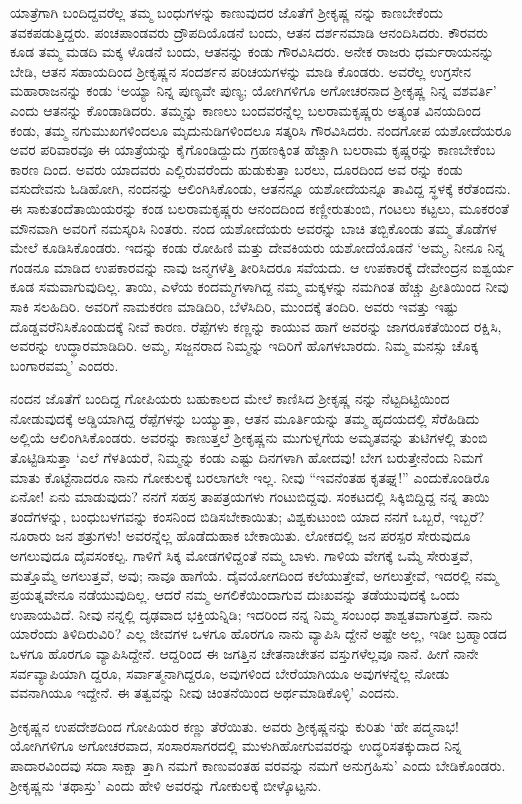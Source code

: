 ಯಾತ್ರೆಗಾಗಿ ಬಂದಿದ್ದವರೆಲ್ಲ ತಮ್ಮ ಬಂಧುಗಳನ್ನು ಕಾಣುವುದರ ಜೊತೆಗೆ ಶ್ರೀಕೃಷ್ಣ ನನ್ನು ಕಾಣಬೇಕೆಂದು ತವಕಪಡುತ್ತಿದ್ದರು. ಪಂಚಪಾಂಡವರು ದ್ರೌಪದಿಯೊಡನೆ ಬಂದು, ಆತನ ದರ್ಶನಮಾಡಿ ಆನಂದಿಸಿದರು. ಕೌರವರು ಕೂಡ ತಮ್ಮ ಮಡದಿ ಮಕ್ಕ ಳೊಡನೆ ಬಂದು, ಆತನನ್ನು ಕಂಡು ಗೌರವಿಸಿದರು. ಅನೇಕ ರಾಜರು ಧರ್ಮರಾಯನನ್ನು ಬೇಡಿ, ಆತನ ಸಹಾಯದಿಂದ ಶ್ರೀಕೃಷ್ಣನ ಸಂದರ್ಶನ ಪರಿಚಯಗಳನ್ನು ಮಾಡಿ ಕೊಂಡರು. ಅವರೆಲ್ಲ ಉಗ್ರಸೇನ ಮಹಾರಾಜನನ್ನು ಕಂಡು ‘ಅಯ್ಯಾ ನಿನ್ನ ಪುಣ್ಯವೇ ಪುಣ್ಯ; ಯೋಗಿಗಳಿಗೂ ಅಗೋಚರನಾದ ಶ್ರೀಕೃಷ್ಣ ನಿನ್ನ ವಶವರ್ತಿ’ ಎಂದು ಆತನನ್ನು ಕೊಂಡಾಡಿದರು. ತಮ್ಮನ್ನು ಕಾಣಲು ಬಂದವರನ್ನೆಲ್ಲ ಬಲರಾಮಕೃಷ್ಣರು ಅತ್ಯಂತ ವಿನಯದಿಂದ ಕಂಡು, ತಮ್ಮ ನಗುಮುಖಗಳಿಂದಲೂ ಮೃದುನುಡಿಗಳಿಂದಲೂ ಸತ್ಕರಿಸಿ ಗೌರವಿಸಿದರು. ನಂದಗೋಪ ಯಶೋದೆಯರೂ ಅವರ ಪರಿವಾರವೂ ಈ ಯಾತ್ರೆಯನ್ನು ಕೈಗೊಂಡಿದ್ದುದು ಗ್ರಹಣಕ್ಕಿಂತ ಹೆಚ್ಚಾಗಿ ಬಲರಾಮ ಕೃಷ್ಣರನ್ನು ಕಾಣಬೇಕೆಂಬ ಕಾರಣ ದಿಂದ. ಅವರು ಯಾದವರು ಎಲ್ಲಿರುವರೆಂದು ಹುಡುಕುತ್ತಾ ಬರಲು, ದೂರದಿಂದ ಅವ ರನ್ನು ಕಂಡು ವಸುದೇವನು ಓಡಿಹೋಗಿ, ನಂದನನ್ನು ಆಲಿಂಗಿಸಿಕೊಂಡು, ಆತನನ್ನೂ ಯಶೋದೆಯನ್ನೂ ತಾವಿದ್ದ ಸ್ಥಳಕ್ಕೆ ಕರೆತಂದನು. ಈ ಸಾಕುತಂದೆತಾಯಿಯರನ್ನು ಕಂಡ ಬಲರಾಮಕೃಷ್ಣರು ಆನಂದದಿಂದ ಕಣ್ಣೀರುತುಂಬಿ, ಗಂಟಲು ಕಟ್ಟಲು, ಮೂಕರಂತೆ ಮೌನವಾಗಿ ಅವರಿಗೆ ನಮಸ್ಕರಿಸಿ ನಿಂತರು. ನಂದ ಯಶೋದೆಯರು ಅವರನ್ನು ಬಾಚಿ ತಬ್ಬಿಕೊಂಡು ತಮ್ಮ ತೊಡೆಗಳ ಮೇಲೆ ಕೂಡಿಸಿಕೊಂಡರು. ಇದನ್ನು ಕಂಡು ರೋಹಿಣಿ ಮತ್ತು ದೇವಕಿಯರು ಯಶೋದೆಯೊಡನೆ ‘ಅಮ್ಮ, ನೀನೂ ನಿನ್ನ ಗಂಡನೂ ಮಾಡಿದ ಉಪಕಾರವನ್ನು ನಾವು ಜನ್ಮಗಳೆತ್ತಿ ತೀರಿಸಿದರೂ ಸವೆಯದು. ಆ ಉಪಕಾರಕ್ಕೆ ದೇವೇಂದ್ರನ ಐಶ್ವರ್ಯ ಕೂಡ ಸಮವಾಗುವುದಿಲ್ಲ. ತಾಯಿ, ಎಳೆಯ ಕಂದಮ್ಮಗಳಾಗಿದ್ದ ನಮ್ಮ ಮಕ್ಕಳನ್ನು ನಮಗಿಂತ ಹೆಚ್ಚು ಪ್ರೀತಿಯಿಂದ ನೀವು ಸಾಕಿ ಸಲಹಿದಿರಿ. ಅವರಿಗೆ ನಾಮಕರಣ ಮಾಡಿದಿರಿ, ಬೆಳೆಸಿದಿರಿ, ಮುಂದಕ್ಕೆ ತಂದಿರಿ. ಅವರು ಇವತ್ತು ಇಷ್ಟು ದೊಡ್ಡವರೆನಿಸಿಕೊಂಡುದಕ್ಕೆ ನೀವೆ ಕಾರಣ. ರೆಪ್ಪೆಗಳು ಕಣ್ಣನ್ನು ಕಾಯುವ ಹಾಗೆ ಅವರನ್ನು ಜಾಗರೂಕತೆಯಿಂದ ರಕ್ಷಿಸಿ, ಅವರನ್ನು ಉದ್ಧಾರಮಾಡಿದಿರಿ. ಅಮ್ಮ, ಸಜ್ಜನರಾದ ನಿಮ್ಮನ್ನು ಇದಿರಿಗೆ ಹೊಗಳಬಾರದು. ನಿಮ್ಮ ಮನಸ್ಸು ಚೊಕ್ಕ ಬಂಗಾರವಮ್ಮ’ ಎಂದರು.

ನಂದನ ಜೊತೆಗೆ ಬಂದಿದ್ದ ಗೋಪಿಯರು ಬಹುಕಾಲದ ಮೇಲೆ ಕಾಣಿಸಿದ ಶ್ರೀಕೃಷ್ಣ ನನ್ನು ನೆಟ್ಟದಿಟ್ಟಿಯಿಂದ ನೋಡುವುದಕ್ಕೆ ಅಡ್ಡಿಯಾಗಿದ್ದ ರೆಪ್ಪೆಗಳನ್ನು ಬಯ್ಯುತ್ತಾ, ಆತನ ಮೂರ್ತಿಯನ್ನು ತಮ್ಮ ಹೃದಯದಲ್ಲಿ ಸೆರೆಹಿಡಿದು ಅಲ್ಲಿಯೆ ಆಲಿಂಗಿಸಿಕೊಂಡರು. ಅವರನ್ನು ಕಾಣುತ್ತಲೆ ಶ್ರೀಕೃಷ್ಣನು ಮುಗುಳ್ನಗೆಯ ಅಮೃತವನ್ನು ತುಟಿಗಳಲ್ಲಿ ತುಂಬಿ ತೊಟ್ಟಿಡಿಸುತ್ತಾ ‘ಎಲೆ ಗೆಳತಿಯರೆ, ನಿಮ್ಮನ್ನು ಕಂಡು ಎಷ್ಟು ದಿನಗಳಾಗಿ ಹೋದವು! ಬೇಗ ಬರುತ್ತೇನೆಂದು ನಿಮಗೆ ಮಾತು ಕೊಟ್ಟೆನಾದರೂ ನಾನು ಗೋಕುಲಕ್ಕೆ ಬರಲಾಗಲೇ ಇಲ್ಲ. ನೀವು “ಇವನೆಂತಹ ಕೃತಘ್ನ!” ಎಂದುಕೊಂಡಿರೊ ಏನೋ! ಏನು ಮಾಡುವುದು? ನನಗೆ ಸಹಸ್ರ ತಾಪತ್ರಯಗಳು ಗಂಟುಬಿದ್ದವು. ಸಂಕಟದಲ್ಲಿ ಸಿಕ್ಕಿಬಿದ್ದಿದ್ದ ನನ್ನ ತಾಯಿ ತಂದೆಗಳನ್ನು, ಬಂಧುಬಳಗವನ್ನು ಕಂಸನಿಂದ ಬಿಡಿಸಬೇಕಾಯಿತು; ವಿಶ್ವಕುಟುಂಬಿ ಯಾದ ನನಗೆ ಒಬ್ಬರೆ, ಇಬ್ಬರೆ? ನೂರಾರು ಜನ ಶತ್ರುಗಳು! ಅವರನ್ನೆಲ್ಲ ಹೊಡೆದುಹಾಕ ಬೇಕಾಯಿತು. ಲೋಕದಲ್ಲಿ ಜನ ಪರಸ್ಪರ ಸೇರುವುದೂ ಅಗಲುವುದೂ ದೈವಸಂಕಲ್ಪ. ಗಾಳಿಗೆ ಸಿಕ್ಕ ಮೋಡಗಳಿದ್ದಂತೆ ನಮ್ಮ ಬಾಳು. ಗಾಳಿಯ ವೇಗಕ್ಕೆ ಒಮ್ಮೆ ಸೇರುತ್ತವೆ, ಮತ್ತೊಮ್ಮೆ ಅಗಲುತ್ತವೆ, ಅವು; ನಾವೂ ಹಾಗೆಯೆ. ದೈವಯೋಗದಿಂದ ಕಲೆಯುತ್ತೇವೆ, ಅಗಲುತ್ತೇವೆ, ಇದರಲ್ಲಿ ನಮ್ಮ ಪ್ರಯತ್ನವೇನೂ ನಡೆಯುವುದಿಲ್ಲ. ಆದರೆ ನಮ್ಮ ಅಗಲಿಕೆಯಿಂದಾಗುವ ದುಃಖವನ್ನು ತಡೆಯುವುದಕ್ಕೆ ಒಂದು ಉಪಾಯವಿದೆ. ನೀವು ನನ್ನಲ್ಲಿ ದೃಢವಾದ ಭಕ್ತಿಯನ್ನಿಡಿ; ಇದರಿಂದ ನನ್ನ ನಿಮ್ಮ ಸಂಬಂಧ ಶಾಶ್ವತವಾಗುತ್ತದೆ. ನಾನು ಯಾರೆಂದು ತಿಳಿದಿರುವಿರಿ? ಎಲ್ಲ ಜೀವಗಳ ಒಳಗೂ ಹೊರಗೂ ನಾನು ವ್ಯಾಪಿಸಿ ದ್ದೇನೆ ಅಷ್ಟೇ ಅಲ್ಲ, ಇಡೀ ಬ್ರಹ್ಮಾಂಡದ ಒಳಗೂ ಹೊರಗೂ ವ್ಯಾಪಿಸಿದ್ದೇನೆ. ಆದ್ದರಿಂದ ಈ ಜಗತ್ತಿನ ಚೇತನಾಚೇತನ ವಸ್ತುಗಳೆಲ್ಲವೂ ನಾನೆ. ಹೀಗೆ ನಾನೇ ಸರ್ವವ್ಯಾಪಿಯಾಗಿ ದ್ದರೂ, ಸರ್ವಾತ್ಮನಾಗಿದ್ದರೂ, ಅವುಗಳಿಂದ ಬೇರೆಯಾಗಿಯೂ ಅವುಗಳನ್ನೆಲ್ಲ ನೋಡು ವವನಾಗಿಯೂ ಇದ್ದೇನೆ. ಈ ತತ್ವವನ್ನು ನೀವು ಚಿಂತನೆಯಿಂದ ಅರ್ಥಮಾಡಿಕೊಳ್ಳಿ’ ಎಂದನು.

ಶ್ರೀಕೃಷ್ಣನ ಉಪದೇಶದಿಂದ ಗೋಪಿಯರ ಕಣ್ಣು ತೆರೆಯಿತು. ಅವರು ಶ್ರೀಕೃಷ್ಣನನ್ನು ಕುರಿತು ‘ಹೇ ಪದ್ಮನಾಭ! ಯೋಗಿಗಳಿಗೂ ಅಗೋಚರವಾದ, ಸಂಸಾರಸಾಗರದಲ್ಲಿ ಮುಳುಗಿಹೋಗುವವರನ್ನು ಉದ್ಧರಿಸತಕ್ಕುದಾದ ನಿನ್ನ ಪಾದಾರವಿಂದವು ಸದಾ ಸಾಕ್ಷಾ ತ್ತಾಗಿ ನಮಗೆ ಕಾಣುವಂತಹ ವರವನ್ನು ನಮಗೆ ಅನುಗ್ರಹಿಸು’ ಎಂದು ಬೇಡಿಕೊಂಡರು. ಶ್ರೀಕೃಷ್ಣನು ‘ತಥಾಸ್ತು’ ಎಂದು ಹೇಳಿ ಅವರನ್ನು ಗೋಕುಲಕ್ಕೆ ಬೀಳ್ಕೊಟ್ಟನು.

